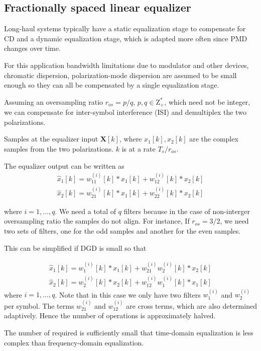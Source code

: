 \documentclass[a4paper]{article}
\begin{document}
\subsection{Fractionally spaced linear equalizer}

Long-haul systems typically have a static equalization stage to compensate for CD and a dynamic equalization stage, which is adapted more often since PMD changes over time.

For this application bandwidth limitations due to modulator and other devices, chromatic dispersion, polarization-mode dispersion are assumed to be small enough so they can all be compensated by a single equalization stage. 

Assuming an oversampling ratio $r_{os} = p/q$, $p, q \in \mathrm{Z^*_+}$, which need not be integer, we can compensate for inter-symbol interference (ISI) and demultiplex the two polarizations.

Samples at the equalizer input $\bm{X}[k]$, where $x_1[k], x_2[k]$ are the complex samples from the two polarizations. $k$ is at a rate $T_s/r_{os}$.

The equalizer output can be written as
\begin{align}
\hat{x}_{1}[k] = w^{(i)}_{11}[k]\ast x_1[k] + w^{(i)}_{12}[k]\ast x_2[k] \\
\hat{x}_{2}[k] = w^{(i)}_{21}[k]\ast x_1[k] + w^{(i)}_{22}[k]\ast x_2[k]
\end{align}

where $i = 1, \ldots, q$. We need a total of $q$ filters because in the case of non-interger oversampling ratio the samples do not align. For instance, If $r_{os} = 3/2$, we need two sets of filters, one for the odd samples and another for the even samples.

This can be simplified if DGD is small so that 

\begin{align}
\hat{x}_{1}[k] = w^{(i)}_{1}[k]\ast x_1[k] + w_{21}^{(i)}w^{(i)}_{2}[k]\ast x_2[k] \\
\hat{x}_{2}[k] = w^{(i)}_{2}[k]\ast x_2[k] + w_{12}^{(i)}w^{(i)}_{1}[k]\ast x_1[k]
\end{align}
where $i = 1, \ldots, q$. Note that in this case we only have two filters $w^{(i)}_{1}$ and $w^{(i)}_{2}$ per symbol. The terms $w_{21}^{(i)}$ and $w_{12}^{(i)}$ are cross terms, which are also determined adaptively. Hence the number of operations is approximately halved.

The number of required is sufficiently small that time-domain equalization is less complex than frequency-domain equalization.
\end{document}
